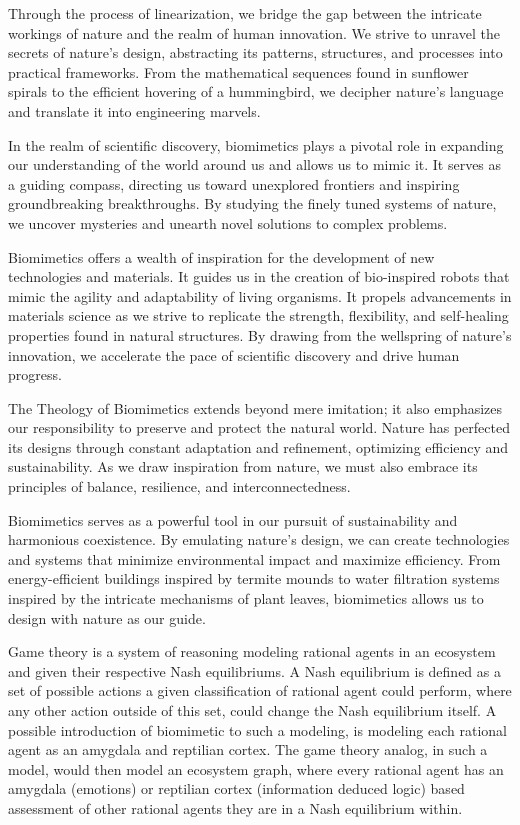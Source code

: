 \documentclass[ebook,12pt,oneside,openany]{memoir}
\begin{document}
\indent Through the process of linearization, we bridge the gap between the intricate workings of nature and the realm of human innovation. We strive to unravel the secrets of nature's design, abstracting its patterns, structures, and processes into practical frameworks. From the mathematical sequences found in sunflower spirals to the efficient hovering of a hummingbird, we decipher nature's language and translate it into engineering marvels.

\indent In the realm of scientific discovery, biomimetics plays a pivotal role in expanding our understanding of the world around us and allows us to mimic it. It serves as a guiding compass, directing us toward unexplored frontiers and inspiring groundbreaking breakthroughs. By studying the finely tuned systems of nature, we uncover mysteries and unearth novel solutions to complex problems.

\indent Biomimetics offers a wealth of inspiration for the development of new technologies and materials. It guides us in the creation of bio-inspired robots that mimic the agility and adaptability of living organisms. It propels advancements in materials science as we strive to replicate the strength, flexibility, and self-healing properties found in natural structures. By drawing from the wellspring of nature's innovation, we accelerate the pace of scientific discovery and drive human progress.

\indent The Theology of Biomimetics extends beyond mere imitation; it also emphasizes our responsibility to preserve and protect the natural world. Nature has perfected its designs through constant adaptation and refinement, optimizing efficiency and sustainability. As we draw inspiration from nature, we must also embrace its principles of balance, resilience, and interconnectedness.

\indent Biomimetics serves as a powerful tool in our pursuit of sustainability and harmonious coexistence. By emulating nature's design, we can create technologies and systems that minimize environmental impact and maximize efficiency. From energy-efficient buildings inspired by termite mounds to water filtration systems inspired by the intricate mechanisms of plant leaves, biomimetics allows us to design with nature as our guide.

\indent Game theory is a system of reasoning modeling rational agents in an ecosystem and given their respective Nash equilibriums. A Nash equilibrium is defined as a set of possible actions a given classification of rational agent could perform, where any other action outside of this set, could change the Nash equilibrium itself. A possible introduction of biomimetic to such a modeling, is modeling each rational agent as an amygdala and reptilian cortex. The game theory analog, in such a model, would then model an ecosystem graph, where every rational agent has an amygdala (emotions) or reptilian cortex (information deduced logic) based assessment of other rational agents they are in a Nash equilibrium within.
\end{document}
